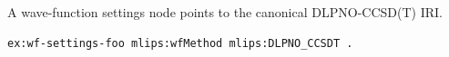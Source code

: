 A wave-function settings node points to the canonical DLPNO-CCSD(T) IRI.
\begin{lstlisting}[language=turtle]
ex:wf-settings-foo mlips:wfMethod mlips:DLPNO_CCSDT .
\end{lstlisting}
